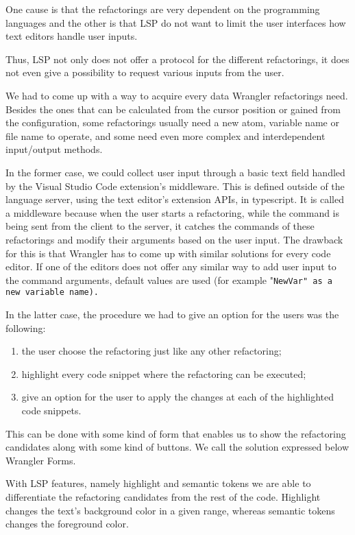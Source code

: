 One cause is that the refactorings are very dependent on the programming languages and the other is that LSP do not want to limit the user interfaces how text editors handle user inputs.

Thus, LSP not only does not offer a protocol for the different refactorings, it does not even give a possibility to request various inputs from the user.

We had to come up with a way to acquire every data Wrangler refactorings need. Besides the ones that can be calculated from the cursor position or gained from the configuration, some refactorings usually need a new atom, variable name or file name to operate, and some need even more complex and interdependent input/output methods. 

In the former case, we could collect user input through a basic text field handled by the Visual Studio Code extension's middleware.
This is defined outside of the language server, using the text editor's extension APIs, in typescript.
It is called a middleware because when the user starts a refactoring, while the command is being sent from the client to the server, it catches the commands of these refactorings and modify their arguments based on the user input.
The drawback for this is that Wrangler has to come up with similar solutions for every code editor. If one of the editors does not offer any similar way to add user input to the command arguments, default values are used (for example "\tt NewVar\rm " as a new variable name).  

In the latter case, the procedure we had to give an option for the users was the following:
\begin{enumerate}
    \item the user choose the refactoring just like any other refactoring;
    \item highlight every code snippet where the refactoring can be executed;
    \item give an option for the user to apply the changes at each of the highlighted code snippets.
\end{enumerate}

This can be done with some kind of form that enables us to show the refactoring candidates along with some kind of buttons. We call the solution expressed below Wrangler Forms.

With LSP features, namely highlight and semantic tokens we are able to differentiate the refactoring candidates from the rest of the code. Highlight changes the text's background color in a given range, whereas semantic tokens changes the foreground color.

